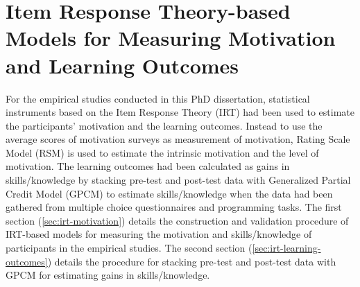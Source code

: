 
\chapter[IRT-based Models for Measuring Motivation and Learning Outcomes]{Item Response Theory-based Models for Measuring Motivation and Learning Outcomes}
\label{appendix:irt-models}

For the empirical studies conducted in this PhD dissertation, statistical instruments based on the Item Response Theory (IRT) had been used to estimate the participants' motivation and the learning outcomes. Instead to use the average scores of motivation surveys as measurement of motivation, Rating Scale Model (RSM) is used to estimate the intrinsic motivation and the level of motivation. The learning outcomes had been calculated as gains in skills/knowledge by stacking pre-test and post-test data with Generalized Partial Credit Model (GPCM) to estimate skills/knowledge when the data had been gathered from multiple choice questionnaires and programming tasks. The first section (\autoref{sec:irt-motivation}) details the construction and validation procedure of IRT-based models for measuring the motivation and skills/knowledge of participants in the empirical studies. The second section (\autoref{sec:irt-learning-outcomes}) details the procedure for stacking pre-test and post-test data with GPCM for estimating gains in skills/knowledge.

